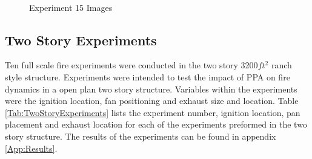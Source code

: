 \documentclass{article}
\begin{document}
\begin{figure}[H]
	\ContinuedFloat 
	\centering 
	 \ 
	\caption{Experiment 15 Images}
	\label{fig:Experiment15ImagesCont3} 
\end{figure}

\subsection{Two Story Experiments} \label{TwoStoryExp}

Ten full scale fire experiments were conducted in the two story 3200$ft^2$ ranch style structure. Experiments were intended to test the impact of PPA on fire dynamics in a open plan two story structure. Variables within the experiments were the ignition location, fan positioning and exhaust size and location. Table \ref{Tab:TwoStoryExperiments} lists the experiment number, ignition location, pan placement and exhaust location for each of the experiments preformed in the two story structure. The results of the experiments can be found in appendix \ref{App:Results}. 
\end{document}
